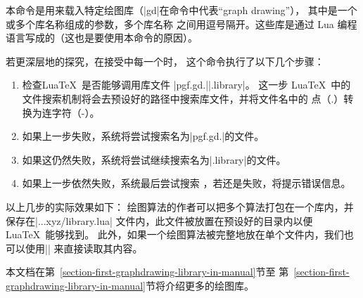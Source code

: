 \begin{command}{\usegdlibrary{}}
本命令是用来载入特定绘图库（|gd|在命令中代表“graph drawing”），
其中是一个或多个库名称组成的参数，多个库名称
之间用逗号隔开。这些库是通过 Lua 编程语言写成的（这也是要使用本命令的原因）。

若更深层地的探究，在接受中每一个时，
这个命令执行了以下几个步骤：
  \begin{enumerate}
  \item
检查Lua\TeX\ 是否能够调用库文件 |pgf.gd.||.library|。
这一步 Lua\TeX\ 中的文件搜索机制将会去预设好的路径中搜索库文件，并将文件名中的
点（.）转换为连字符（-）。
  \item
如果上一步失败，系统将尝试搜索名为|pgf.gd.|的文件。
  \item
如果这仍然失败，系统将尝试继续搜索名为|.library|的文件。
  \item 
如果上一步依然失败，系统最后尝试搜索 ，若还是失败，将提示错误信息。
  \end{enumerate}
以上几步的实际效果如下：
绘图算法的作者可以把多个算法打包在一个库内，并保存在|...xyz/library.lua|
文件内，此文件被放置在预设好的目录内以便 Lua\TeX\ 能够找到。
此外，如果一个绘图算法被完整地放在单个文件内，我们也可以使用|\usegdlibrary|
来直接读取其内容。
\begin{codeexample}
\usetikzlibrary{graphdrawing}
\end{codeexample}

本文档在第~\ref{section-first-graphdrawing-library-in-manual}节至
第~\ref{section-first-graphdrawing-library-in-manual}节将介绍更多的绘图库。
\end{command}


